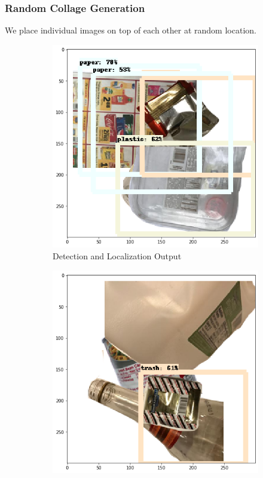 \documentclass{article}
\begin{document}
\subsubsection{Random Collage Generation}
We place individual images on top of each other at random location. 

\begin{figure}[h!]
    \centering
    \begin{subfigure}{0.3\linewidth}
    \includegraphics[width=\linewidth]{data/images/04_random_collage/Output_1.png}
    \caption{Detection and Localization Output}
    \end{subfigure}
    \begin{subfigure}{0.3\linewidth}
    \includegraphics[width=\linewidth]{data/images/04_random_collage/Output_2.png}

\end{subfigure}
\end{figure}
\end{document}
